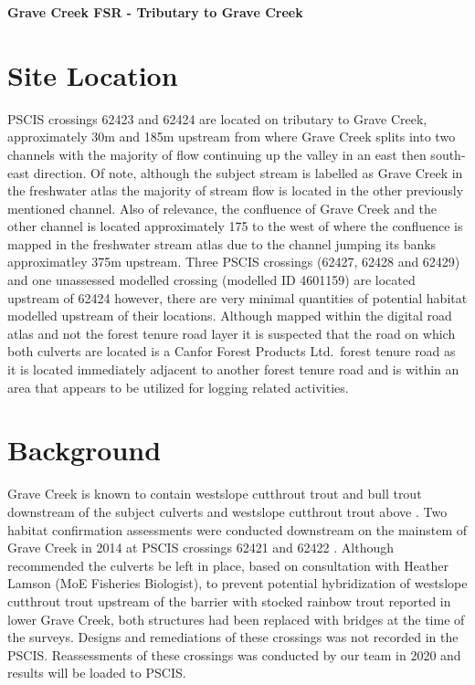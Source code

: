 \documentclass[
]{book}
\begin{document}
\textbf{Grave Creek FSR - Tributary to Grave Creek}

\hypertarget{site-location-3}{%
\section*{Site Location}\label{site-location-3}}

PSCIS crossings 62423 and 62424 are located on tributary to Grave Creek, approximately 30m and 185m upstream from where Grave Creek splits into two channels with the majority of flow continuing up the valley in an east then south-east direction. Of note, although the subject stream is labelled as Grave Creek in the freshwater atlas the majority of stream flow is located in the other previously mentioned channel. Also of relevance, the confluence of Grave Creek and the other channel is located approximately 175 to the west of where the confluence is mapped in the freshwater stream atlas due to the channel jumping its banks approximatley 375m upstream. Three PSCIS crossings (62427, 62428 and 62429) and one unassessed modelled crossing (modelled ID 4601159) are located upstream of 62424 however, there are very minimal quantities of potential habitat modelled upstream of their locations. Although mapped within the digital road atlas and not the forest tenure road layer it is suspected that the road on which both culverts are located is a Canfor Forest Products Ltd.~forest tenure road as it is located immediately adjacent to another forest tenure road and is within an area that appears to be utilized for logging related activities.

\hypertarget{background-4}{%
\section*{Background}\label{background-4}}

Grave Creek is known to contain westslope cutthrout trout and bull trout downstream of the subject culverts and westslope cutthrout trout above \citep{data_fish_obs}. Two habitat confirmation assessments were conducted downstream on the mainstem of Grave Creek in 2014 at PSCIS crossings 62421 and 62422 \citep{masseEKConfirmation2015}. Although \citet{masseEKConfirmation2015} recommended the culverts be left in place, based on consultation with Heather Lamson (MoE Fisheries Biologist), to prevent potential hybridization of westslope cutthrout trout upstream of the barrier with stocked rainbow trout reported in lower Grave Creek, both structures had been replaced with bridges at the time of the surveys. Designs and remediations of these crossings was not recorded in the PSCIS. Reassessments of these crossings was conducted by our team in 2020 and results will be loaded to PSCIS.
\end{document}
